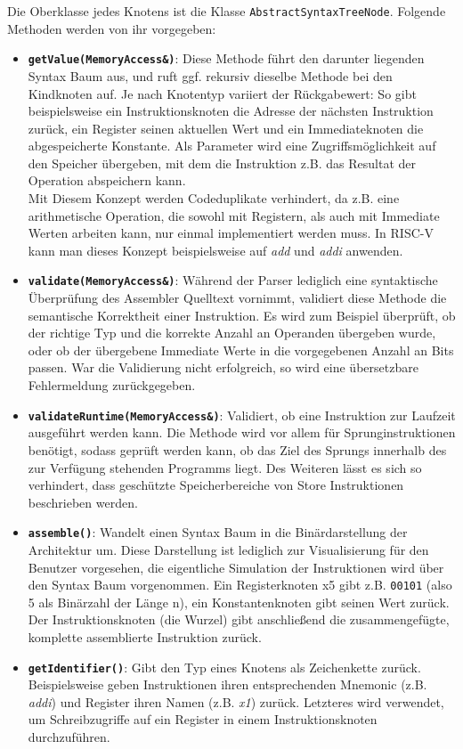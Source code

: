 Die Oberklasse jedes Knotens ist die Klasse \texttt{AbstractSyntaxTreeNode}.
Folgende Methoden werden von ihr vorgegeben:

\begin{itemize}
	\label{dev-manual-arch-node-functions}
	\item \textbf{\texttt{getValue(MemoryAccess\&)}}: Diese Methode führt den
	darunter liegenden Syntax Baum aus, und ruft ggf. rekursiv dieselbe Methode
	bei den Kindknoten auf. Je nach Knotentyp variiert der Rückgabewert: So gibt
	beispielsweise ein Instruktionsknoten die Adresse der nächsten Instruktion
	zurück, ein Register seinen aktuellen Wert und ein Immediateknoten die
	abgespeicherte Konstante. Als Parameter wird eine Zugriffsmöglichkeit auf den
	Speicher übergeben, mit dem die Instruktion z.B. das Resultat der Operation
	abspeichern kann. \\
	Mit Diesem Konzept werden Codeduplikate verhindert, da z.B. eine arithmetische
	Operation, die sowohl mit Registern, als auch mit Immediate Werten arbeiten
	kann, nur einmal implementiert werden muss. In RISC-V kann man dieses Konzept
	beispielsweise auf \emph{add} und \emph{addi} anwenden.

	\item \textbf{\texttt{validate(MemoryAccess\&)}}: Während der Parser lediglich
	eine syntaktische Überprüfung des Assembler Quelltext vornimmt, validiert
	diese Methode die semantische Korrektheit einer Instruktion. Es wird zum
	Beispiel überprüft, ob der richtige Typ und die korrekte Anzahl an Operanden
	übergeben wurde, oder ob der übergebene Immediate Werte in die vorgegebenen
	Anzahl an Bits passen. War die Validierung nicht erfolgreich, so wird eine
	übersetzbare Fehlermeldung zurückgegeben.

	\item \textbf{\texttt{validateRuntime(MemoryAccess\&)}}: Validiert, ob eine
	Instruktion zur Laufzeit ausgeführt werden kann. Die Methode wird vor allem
	für Sprunginstruktionen benötigt, sodass geprüft werden kann, ob das Ziel
	des Sprungs innerhalb des zur Verfügung stehenden Programms liegt. Des
	Weiteren lässt es sich so verhindert, dass geschützte Speicherbereiche
	von Store Instruktionen beschrieben werden.

	\item \textbf{\texttt{assemble()}}: Wandelt einen Syntax Baum in die
	Binärdarstellung der Architektur um. Diese Darstellung ist lediglich zur
	Visualisierung für den Benutzer vorgesehen, die eigentliche Simulation der
	Instruktionen wird über den Syntax Baum vorgenommen. Ein Registerknoten x5 
	gibt z.B. \texttt{00101} (also 5 als Binärzahl der Länge n), ein Konstantenknoten gibt seinen Wert
	zurück. Der Instruktionsknoten (die Wurzel) gibt anschließend die
	zusammengefügte, komplette assemblierte Instruktion zurück.

	\item \textbf{\texttt{getIdentifier()}}: Gibt den Typ eines Knotens als
	Zeichenkette zurück. Beispielsweise geben Instruktionen ihren entsprechenden
	Mnemonic (z.B. \emph{addi}) und Register ihren Namen (z.B. \emph{x1})
	zurück. Letzteres wird verwendet, um Schreibzugriffe auf ein Register
	in einem Instruktionsknoten durchzuführen.
\end{itemize}

